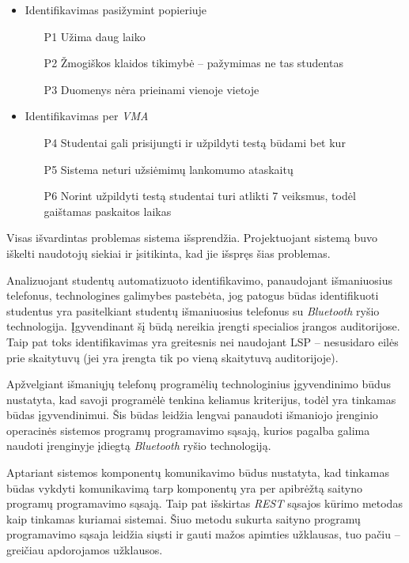 \documentclass{VUMIFPSkursinis}
\begin{document}
\begin{itemize}
    \item Identifikavimas pasižymint popieriuje
    \begin{itemize}
        \item[P1] Užima daug laiko
        \item[P2] Žmogiškos klaidos tikimybė – pažymimas ne tas studentas
        \item[P3] Duomenys nėra prieinami vienoje vietoje
    \end{itemize}
    \item Identifikavimas per \textit{VMA}
    \begin{itemize}
        \item[P4] Studentai gali prisijungti ir užpildyti testą būdami bet kur
        \item[P5] Sistema neturi užsiėmimų lankomumo ataskaitų
        \item[P6] Norint užpildyti testą studentai turi atlikti 7 veiksmus, todėl gaištamas paskaitos laikas
    \end{itemize}
\end{itemize}

Visas išvardintas problemas sistema išsprendžia. Projektuojant sistemą buvo iškelti naudotojų siekiai ir įsitikinta, kad jie išspręs šias problemas.

Analizuojant studentų automatizuoto identifikavimo, panaudojant išmaniuosius telefonus, technologines galimybes pastebėta, jog patogus būdas identifikuoti studentus yra pasitelkiant studentų išmaniuosius telefonus su \textit{Bluetooth} ryšio technologija. Įgyvendinant šį būdą nereikia įrengti specialios įrangos auditorijose. Taip pat toks identifikavimas yra greitesnis nei naudojant LSP – nesusidaro eilės prie skaitytuvų (jei yra įrengta tik po vieną skaitytuvą auditorijoje).

Apžvelgiant išmaniųjų telefonų programėlių technologinius įgyvendinimo būdus nustatyta, kad savoji programėlė tenkina keliamus kriterijus, todėl yra tinkamas būdas įgyvendinimui. Šis būdas leidžia lengvai panaudoti išmaniojo įrenginio operacinės sistemos programų programavimo sąsają, kurios pagalba galima naudoti įrenginyje įdiegtą \textit{Bluetooth} ryšio technologiją.

Aptariant sistemos komponentų komunikavimo būdus nustatyta, kad tinkamas būdas vykdyti komunikavimą tarp komponentų yra per apibrėžtą saityno programų programavimo sąsają. Taip pat išskirtas \textit{REST} sąsajos kūrimo metodas kaip tinkamas kuriamai sistemai. Šiuo metodu sukurta saityno programų programavimo sąsaja leidžia siųsti ir gauti mažos apimties užklausas, tuo pačiu – greičiau apdorojamos užklausos.
\end{document}
